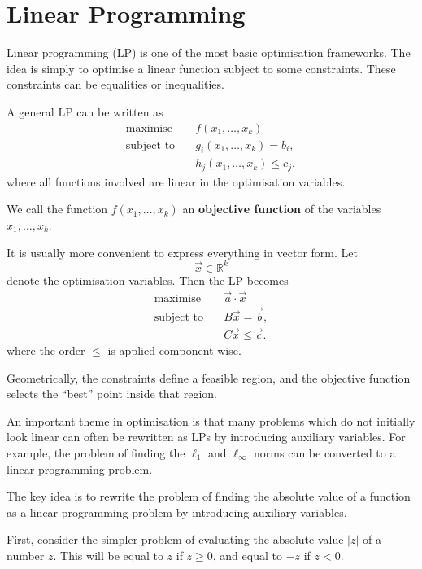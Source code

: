 \section{Linear Programming}

Linear programming (LP) is one of the most basic optimisation frameworks. The idea is simply to optimise a linear function subject to some constraints. These constraints can be equalities or inequalities.

A general LP can be written as
\begin{align}
    \text{maximise} \quad & f(x_1,\dots,x_k)           \\
    \text{subject to} \quad
                          & g_i(x_1,\dots,x_k)=b_i,    \\
                          & h_j(x_1,\dots,x_k)\le c_j,
\end{align}
where all functions involved are linear in the optimisation variables.

We call the function $f(x_1, \dots, x_k)$ an \textbf{objective function} of the variables $x_1, \dots, x_k$.

It is usually more convenient to express everything in vector form. Let
\[
    \vec{x}\in\mathbb{R}^k
\]
denote the optimisation variables. Then the LP becomes
\begin{align}
    \text{maximise} \quad & \vec{a}\cdot\vec{x}  \\
    \text{subject to} \quad
    \label{equality-condition}
                          & B\vec{x}=\vec{b},    \\
    \label{inequality-condition}
                          & C\vec{x}\le \vec{c}.
\end{align}
where the order $\le$ is applied component-wise.

Geometrically, the constraints define a feasible region, and the objective function selects the “best” point inside that region.

An important theme in optimisation is that many problems which do not initially look linear can often be rewritten as LPs by introducing auxiliary variables. For example, the problem of finding the $\ell_1$ and $\ell_{\infty}$ norms can be converted to a linear programming problem.

The key idea is to rewrite the problem of finding the absolute value of a function as a linear programming problem by introducing auxiliary variables.

First, consider the simpler problem of evaluating the absolute value \(|z|\) of a number \(z\). This will be equal to \(z\) if \(z\ge 0\), and equal to \(-z\) if \(z<0\).

